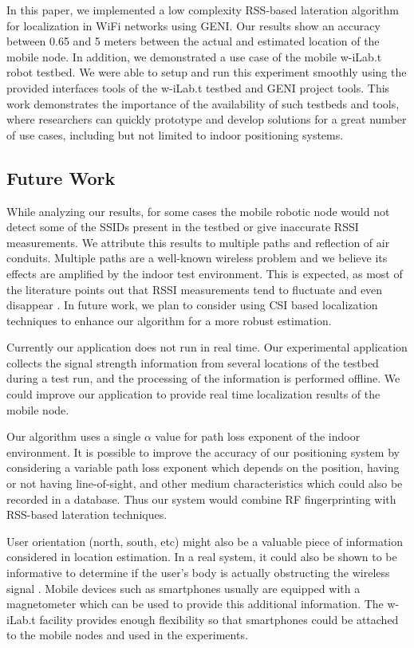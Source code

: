 \documentclass[journal]{IEEEtran} 				\IEEEoverridecommandlockouts 						\usepackage{amsmath,amssymb}
\begin{document}
In this paper, we implemented a low complexity RSS-based lateration algorithm for localization in WiFi networks using GENI. Our results show an accuracy between 0.65 and 5 meters between the actual and estimated location of the mobile node. In addition, we demonstrated a use case of the mobile w-iLab.t robot testbed. We were able to setup and run this experiment smoothly using the provided interfaces tools of the w-iLab.t testbed and GENI project tools. This work demonstrates the importance of the availability of such testbeds and tools, where researchers can quickly prototype and develop solutions for a great number of use cases, including but not limited to indoor positioning systems.

\subsection{Future Work}\label{sec:futurework}

While analyzing our results, for some cases the mobile robotic node would not detect some of the SSIDs present in the testbed or give inaccurate RSSI measurements. We attribute this results to multiple paths and reflection of air conduits. Multiple paths are a well-known wireless problem and we believe its effects are amplified by the indoor test environment. This is expected, as most of the literature points out that RSSI measurements tend to fluctuate and even disappear \cite{ChandrasekaranEYLCGM09}. In future work, we plan to consider using CSI based localization techniques to enhance our algorithm for a more robust estimation.

Currently our application does not run in real time. Our experimental application collects the signal strength information from several locations of the testbed during a test run, and the processing of the information is performed offline. We could improve our application to provide real time localization results of the mobile node.

Our algorithm uses a single $\alpha$ value for path loss exponent of the indoor environment. It is possible to improve the accuracy of our positioning system by considering a variable path loss exponent which depends on the position, having or not having line-of-sight, and other medium characteristics which could also be recorded in a database. Thus our system would combine RF fingerprinting with RSS-based lateration techniques.

User orientation (north, south, etc) might also be a valuable piece of information considered in location estimation. In a real system, it could also be shown to be informative to determine if the user's body is actually obstructing the wireless signal \cite{Bahl_Padmanabhan_2000}. Mobile devices such as smartphones usually are equipped with a magnetometer which can be used to provide this additional information. The w-iLab.t facility provides enough flexibility so that smartphones could be attached to the mobile nodes and used in the experiments.
\end{document}
